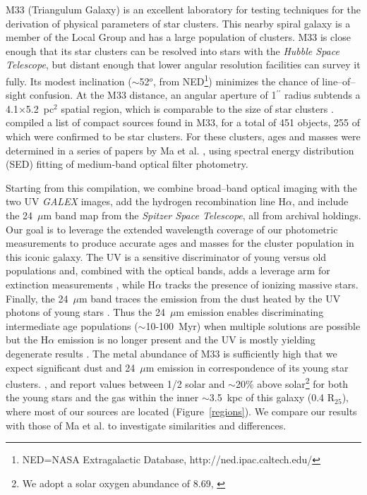 \documentclass{aastex63}
\begin{document}
M33 (Triangulum Galaxy) is an excellent laboratory for testing techniques for the derivation of physical parameters of star clusters. This nearby spiral galaxy \citep[850 kpc;][]{Ferrarese+2000} is a member of the Local Group and has a large population of clusters. M33 is close enough that its star clusters can be resolved into stars with the \textit{Hubble Space Telescope}, but distant enough that lower angular resolution facilities can survey it fully. Its modest inclination ($\sim$52$^o$, from  NED\footnote{NED=NASA Extragalactic Database,  http://ned.ipac.caltech.edu/}) minimizes the chance of line--of--sight confusion. At the M33 distance, an angular aperture of  1$^{\prime\prime}$ radius subtends a 4.1$\times$5.2~pc$^2$  spatial region, which is comparable to the size of star clusters \citep{ryon2017, BrownGnedin2021}. \citet{Sarajedini2007} compiled a list of compact  sources found in M33, for a total of 451 objects, 255 of which were confirmed to be star clusters. For these clusters, ages and masses were determined in a series of papers by Ma et al. \citep{Ma+2001,  Ma+2002b, Ma+2002c, Ma+2002a, Ma+2004a, Ma+2004b}, using spectral energy distribution (SED) fitting of medium-band optical filter photometry. 

Starting from this compilation, we combine   broad--band optical imaging with the two UV  \textit{GALEX} images, add the hydrogen recombination line H$\alpha$, and include the 24~$\mu$m band map from the \textit{Spitzer Space Telescope}, all from archival holdings. Our goal is to leverage the extended wavelength coverage of our photometric measurements to produce accurate ages and masses for the cluster population in this iconic galaxy. The UV is a sensitive discriminator of young versus old populations and, combined with the optical bands, adds a leverage arm for extinction measurements \citep{Calzetti+2015}, while H$\alpha$ tracks the presence of ionizing massive stars. Finally, the 24~$\mu$m band traces the emission from the dust heated by the UV photons of young stars \citep[$\lesssim$100~Myr,][]{KennicuttEvans2012}. Thus the 24~$\mu$m emission enables discriminating intermediate age populations ($\sim$10-100~Myr) when multiple solutions are possible but the H$\alpha$ emission is no longer present and the UV is mostly yielding degenerate results \citep{Leitherer+1999}. The metal abundance of M33 is sufficiently high that we expect significant dust and 24~$\mu$m emission in correspondence of its young star clusters. \citet{U+2009}, \citet{Bresolin+2011} and \citet{Toribio+2016} report values between 1/2 solar and $\sim$20\% above solar\footnote{We adopt a solar oxygen abundance of 8.69, \citep{Asplund+2009}} for both the young stars and the gas within the inner $\sim$3.5~kpc of this galaxy (0.4 R$_{25}$), where most of our sources are located (Figure~\ref{regions}). We compare our results with those of Ma et al. to investigate similarities and differences. 
\end{document}
